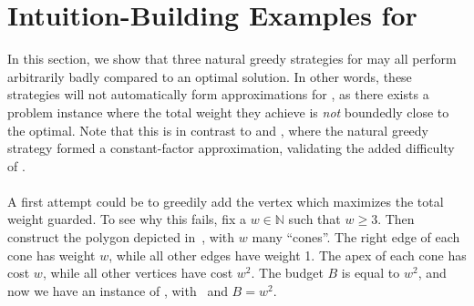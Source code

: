\section{Intuition-Building Examples for \BMVVG{}}
In this section, we show that three natural greedy strategies for \BMVVG{} may all perform arbitrarily badly compared to an optimal solution. In other words, these strategies will not automatically form approximations for \BMVVG{}, as there exists a problem instance where the total weight they achieve is \emph{not} boundedly close to the optimal. Note that this is in contrast to \MLVG{} and \MVVG{}, where the natural greedy strategy formed a constant-factor approximation, validating the added difficulty of \BMVVG{}. \\\\
A first attempt could be to greedily add the vertex which maximizes the total weight guarded. To see why this fails, fix a $w\in\mathbb{N}$ such that $w\geq 3$. Then construct the polygon depicted in~, with $w$ many ``cones''. The right edge of each cone has weight $w$, while all other edges have weight 1. The apex of each cone has cost $w$, while all other vertices have cost $w^2$. The budget $B$ is equal to $w^2$, and now we have an instance of \BMVVG{}, with~ and $B=w^2$.\\\\
